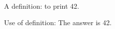 
A definition:  to print {\mktsStyleCode{}42}.\mktsShowpar\par
Use of definition: The answer is {\mktsStyleBold{}42}.\mktsShowpar\par


